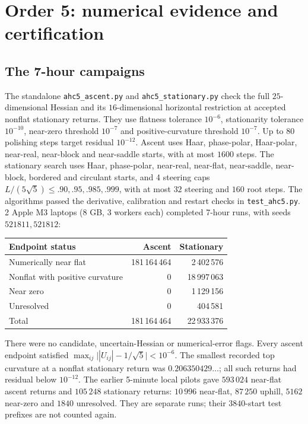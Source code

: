 \documentclass[11pt,a4paper]{article}
\begin{document}
\section{Order 5: numerical evidence and certification}\label{fivecampaign}
\subsection{The 7-hour campaigns}
The standalone \texttt{ahc5\_ascent.py} and
\texttt{ahc5\_stationary.py} check the full $25$-dimensional
Hessian and its $16$-dimensional horizontal restriction at accepted
nonflat stationary returns. They use flatness tolerance $10^{-6}$,
stationarity tolerance $10^{-10}$, near-zero threshold $10^{-7}$ and
positive-curvature threshold $10^{-7}$. Up to $80$ polishing steps
target residual $10^{-12}$. Ascent uses Haar, phase-polar,
Haar-polar, near-real, near-block and near-saddle starts, with at most
$1600$ steps. The stationary search uses Haar, phase-polar, near-real,
near-flat, near-saddle, near-block, bordered and circulant starts, and
4 steering caps $L/(5\sqrt5)\le .90,.95,.985,.999$, with at most
$32$ steering and $160$ root steps. The algorithms passed the derivative,
calibration and restart checks in \texttt{test\_ahc5.py}.
2 Apple M3 laptops (8 GB, 3 workers each)
completed 7-hour runs, with seeds $521811,521812$:
\begin{center}
\begin{tabular}{lrr}
\toprule
Endpoint status & Ascent & Stationary\\
\midrule
Numerically near flat &181\,164\,464&2\,402\,576\\
Nonflat with positive curvature &0&18\,997\,063\\
Near zero &0&1\,129\,156\\
Unresolved &0&404\,581\\
\midrule
Total &181\,164\,464&22\,933\,376\\
\bottomrule
\end{tabular}
\end{center}
There were no candidate, uncertain-Hessian or numerical-error flags.
Every ascent endpoint satisfied
$\max_{ij}\big||U_{ij}|-1/\sqrt5\big|<10^{-6}$.
The smallest recorded top curvature at a nonflat stationary return was
$0.206350429\ldots$; all such returns had residual below $10^{-12}$.
The earlier 5-minute local pilots gave $593\,024$ near-flat ascent
returns and $105\,248$ stationary returns: $10\,996$ near-flat,
$87\,250$ uphill, $5162$ near-zero and $1840$ unresolved. They are
separate runs; their $3840$-start test prefixes are not counted again.
\end{document}
